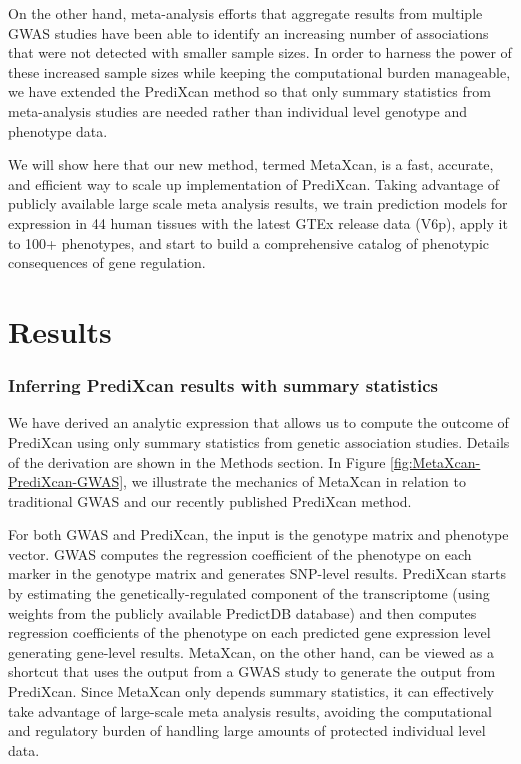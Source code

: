 \documentclass[10pt]{article}
\begin{document}
On the other hand, meta-analysis efforts that aggregate results from multiple GWAS studies have been able to identify an increasing number of associations that were not detected with smaller sample sizes. In order to harness the power of these increased sample sizes while keeping the computational burden manageable, we have extended the PrediXcan method so that only summary statistics from meta-analysis studies are needed rather than individual level genotype and phenotype data. 

We will show here that our new method, termed MetaXcan, is a fast, accurate, and efficient way to scale up implementation of PrediXcan. Taking advantage of publicly available large scale meta analysis results, we train prediction models for expression in 44 human tissues with the latest GTEx release data (V6p), apply it to 100+ phenotypes, and start to build a comprehensive catalog of phenotypic consequences of gene regulation.

\section*{Results}

\subsubsection*{Inferring PrediXcan results with summary statistics}

We have derived an analytic expression that allows us to compute the outcome of PrediXcan using only summary statistics from genetic association studies. Details of the derivation are shown in the Methods section. In Figure \ref{fig:MetaXcan-PrediXcan-GWAS}, we illustrate the mechanics of MetaXcan in relation to traditional GWAS and our recently published PrediXcan method.

For both GWAS and PrediXcan, the input is the genotype matrix and phenotype vector. GWAS computes the regression coefficient of the phenotype on each marker in the genotype matrix and generates SNP-level results. PrediXcan starts by estimating the genetically-regulated component of the transcriptome (using weights from the publicly available PredictDB database) and then computes regression coefficients of the phenotype on each predicted gene expression level generating gene-level results. MetaXcan, on the other hand,  can be viewed as a shortcut that uses the output from a GWAS study to generate the output from PrediXcan. Since MetaXcan only depends summary statistics, it can effectively take advantage of large-scale meta analysis results, avoiding the computational and regulatory burden of handling large amounts of protected individual level data.
\end{document}
